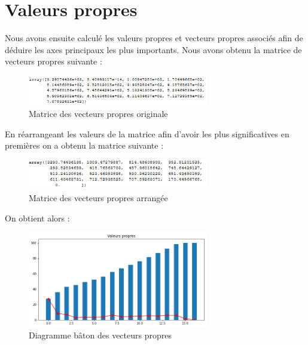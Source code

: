 \documentclass[12,french]{report}
\begin{document}
\section{Valeurs propres}
    Nous avons ensuite calculé les valeurs propres et vecteurs propres associés afin de déduire les axes principaux les plus importants. Nous avons obtenu la matrice de vecteurs propres suivante :\\

\begin{figure}[H]
	\center
	\includegraphics[width=0.7\textwidth]{./Images/13}
	\caption{Matrice des vecteurs propres originale}
\end{figure}\vspace{0.1cm}

	En réarrangeant les valeurs de la matrice afin d’avoir les plus significatives en premières on a obtenu la matrice suivante :\\
	
\begin{figure}[H]
	\center
	\includegraphics[width=0.7\textwidth]{./Images/14}
	\caption{Matrice des vecteurs propres arrangée}
\end{figure}\vspace{0.1cm}

	On obtient alors :

\begin{figure}[H]
	\center
	\includegraphics[width=0.7\textwidth]{./Images/15}
	\caption{Diagramme bâton des vecteurs propres}
\end{figure}\vspace{0.1cm}
\end{document}

